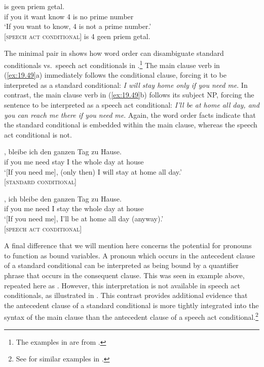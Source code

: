 \ea \label{ex:19.48}
\ea  {}  is  geen  priem  getal.\\
 if  you  it  want  know  4  is  no  prime  number\\
\glt ‘If you want to know, 4 is not a prime number.’ \\
\hfill [\textsc{speech act} \textsc{conditional}]
 is 4 geen priem getal.
\z \z


The minimal pair in  shows how word order can disambiguate standard conditionals vs.~speech act conditionals in .\footnote{The examples in  are from \citet[102]{Scheffler2013}.} The main clause verb in (\ref{ex:19.49}a) immediately follows the conditional clause, forcing it to be interpreted as a standard conditional: \textit{I will stay home only if you need me}. In contrast, the main clause verb in (\ref{ex:19.49}b) follows its subject NP, forcing the sentence to be interpreted as a speech act conditional: \textit{I’ll be at home all day, and you can reach me there if you need me}. Again, the word order facts indicate that the standard conditional is embedded within the main clause, whereas the speech act conditional is not.


\ea \label{ex:19.49}
\ea   \gll{},  bleibe  ich  den  ganzen  Tag  zu  Hause.\\
 if  you  me  need  stay  I  the  whole  day  at  house\\
\glt ‘[If you need me], (only then) I will stay at home all day.’ \\
\hfill [\textsc{standard conditional}]

\ex
  \gll{},  ich  bleibe  den  ganzen  Tag  zu  Hause.\\
 if  you  me  need  I  stay  the  whole  day  at  house\\
\glt ‘[If you need me], I’ll be at home all day (anyway).’ \\
\hfill [\textsc{speech act} \textsc{conditional}]
\z
\z

A final difference that we will mention here concerns the potential for pronouns to function as bound variables. A pronoun which occurs in the antecedent clause of a standard conditional can be interpreted as being bound by a quantifier phrase that occurs in the consequent clause. This was seen in example  above, repeated here as . However, this interpretation is not available in speech act conditionals, as illustrated in . This contrast provides additional evidence that the antecedent clause of a standard conditional is more tightly integrated into the syntax of the main clause than the antecedent clause of a speech act conditional.\footnote{See \citet{EbertEtAl2008} for similar examples in .}


